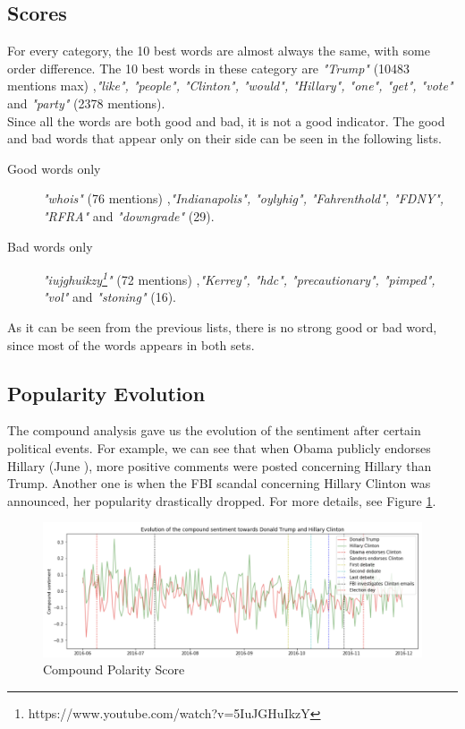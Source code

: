 \documentclass[11pt]{article}
\begin{document}
\subsection{Scores}
For every category, the 10 best words are almost always the same, with some order difference. The 10 best words in these category are \textit{"Trump"} (10483 mentions max) ,\textit{"like", "people", "Clinton", "would", "Hillary", "one", "get", "vote"} and \textit{"party"} (2378 mentions).\\
Since all the words are both good and bad, it is not a good indicator. The good and bad words that appear only on their side can be seen in the following lists.

\begin{description}
    \item[Good words only] \textit{"whois"} (76 mentions) ,\textit{"Indianapolis", "oylyhig", "Fahrenthold", "FDNY", "RFRA"} and \textit{"downgrade"} (29).
\end{description}

\begin{description}
    \item[Bad words only] \textit{"iujghuikzy\footnote{https://www.youtube.com/watch?v=5IuJGHuIkzY}"} (72 mentions) ,\textit{"Kerrey", "hdc", "precautionary", "pimped", "vol"} and \textit{"stoning"} (16).
\end{description}

As it can be seen from the previous lists, there is no strong good or bad word, since most of the words appears in both sets.  
 
\subsection{Popularity Evolution}
The compound analysis gave us the evolution of the sentiment after certain political events. For example, we can see that when Obama publicly endorses Hillary (June ), more positive comments were posted concerning Hillary than Trump. Another one is when the FBI scandal concerning Hillary Clinton was announced, her popularity drastically dropped. For more details, see Figure \ref{Popularity_score}.

\begin{figure}[!h]
\centering\includegraphics[width=\textwidth]{Images/compound_ev.png}
\caption{Compound Polarity Score}
\label{Popularity_score}
\end{figure}
\end{document}
